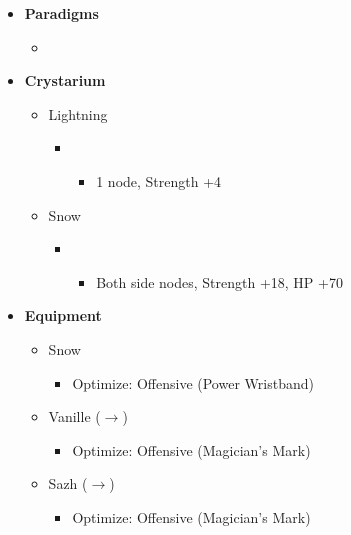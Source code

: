 	\begin{menu}
		\begin{itemize}
			\item \textbf{Paradigms}
			      \begin{itemize}
				      \item {}%
				            {\paradigmline{(\rav)}{\rav}{\rav}}%
				            {\paradigmline{\com}{\sen}{\med}}%
				            {\paradigmline[3]{\textit{[\com]}}{\textit{\com}}{\textit{\rav}}}%
				            {\paradigmline{[\com]}{\com}{\rav}}
			      \end{itemize}
			\item \textbf{Crystarium}
			      \begin{itemize}
				      \item Lightning
				            \begin{itemize}
					            \item \com
					                  \begin{itemize}
						                  \item 1 node, Strength +4
					                  \end{itemize}
				            \end{itemize}
				      \item Snow
				            \begin{itemize}
					            \item \com
					                  \begin{itemize}
						                  \item Both side nodes, Strength +18, HP +70
					                  \end{itemize}
				            \end{itemize}
			      \end{itemize}

			\item \textbf{Equipment}
			      \begin{itemize}
				      \item Snow
				            \begin{itemize}
					            \item Optimize: Offensive (Power Wristband)
				            \end{itemize}
				      \item Vanille ($\rightarrow$)
				            \begin{itemize}
					            \item Optimize: Offensive (Magician's Mark)
				            \end{itemize}
				      \item Sazh ($\rightarrow$)
				            \begin{itemize}
					            \item Optimize: Offensive (Magician's Mark)
				            \end{itemize}
			      \end{itemize}
		\end{itemize}
	\end{menu}
	\renewcommand{\first}{[1] Tri-Disaster (\rav/\rav/\rav)}

